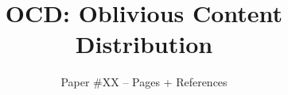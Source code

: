 \documentclass[9pt,twocolumn]{confpaper}
\begin{document}
\date{}
\title{\ttlfnt OCD: Oblivious Content Distribution}
\author{
{\aufnt Paper \#XX -- \pageref{lastpage} Pages + References} \\
}




\maketitle

\begin{abstract}
\end{abstract}










\label{lastpage} 


\balance 
\end{document}
